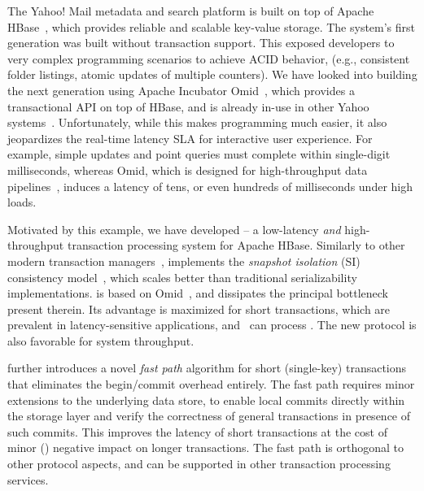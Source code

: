 The Yahoo! Mail metadata and search platform is built on top of Apache HBase~\cite{hbase}, 
which provides reliable and scalable key-value storage. The system's first generation
was built without transaction support. This exposed  developers to very complex programming scenarios 
to achieve ACID behavior, (e.g., consistent folder listings, atomic updates of multiple counters). 
We have looked into building the next generation using 
 Apache Incubator Omid~\cite{omid}, which provides a transactional API on top of HBase, and 
 is already in-use in other Yahoo systems~\cite{omid-blog}.
Unfortunately, while this makes programming much easier, it also jeopardizes 
the real-time latency SLA for interactive user experience. For example,  
simple updates and point queries must complete within single-digit milliseconds, 
whereas Omid, which is designed for high-throughput data pipelines~\cite{Omid2017}, 
induces a latency of tens, or even hundreds of milliseconds under high loads. 

Motivated by this example, we have developed {\sys\/} -- a low-latency {\em and\/} high-throughput 
transaction processing system for Apache HBase. Similarly to other modern transaction managers~\cite{cockroach,Spanner2012,Percolator2010,Omid2017},
{\sys\/} implements the {\em snapshot isolation} (SI) consistency model~\cite{DBLP:conf/sigmod/BerensonBGMOO95},
which scales better than traditional serializability implementations. {\sys\/} is based on Omid~\cite{omid}, 
and dissipates the principal bottleneck present therein.
Its advantage is maximized for short  transactions, which are prevalent in latency-sensitive applications,
and \sys\ can process . The new protocol is also favorable for system throughput. 

{\sys\/} further introduces a novel {\em fast path\/} algorithm for short (single-key) transactions 
that eliminates the begin/commit overhead entirely. The fast path requires minor extensions to the underlying 
data store, to enable local commits directly within the storage layer and verify the correctness of general 
transactions in presence of such commits. This improves the latency of short transactions 
 at the cost of minor () negative impact on longer transactions. 
The fast path is orthogonal to other protocol aspects, and can be  supported in other 
transaction processing services.

